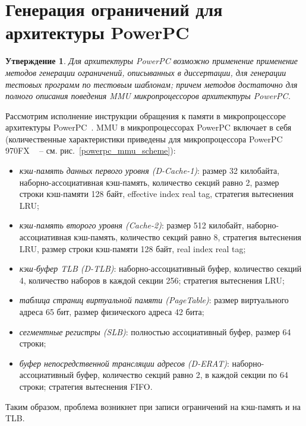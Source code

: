 \documentclass[14pt]{extreport}
\newtheorem{utv}{Утверждение}
\newcommand{\LRU}{\textsf{LRU}\xspace}
\newcommand{\FIFO}{\textsf{FIFO}\xspace}
\begin{document}


\section{Генерация ограничений для архитектуры PowerPC}

\begin{utv}
Для архитектуры PowerPC возможно применение применение методов
генерации ограничений, описыванных в диссертации, для генерации
тестовых программ по тестовым шаблонам; причем методов достаточно
для полного описания поведения MMU микропроцессоров архитектуры
PowerPC.
\end{utv}

Рассмотрим исполнение инструкции обращения к памяти в
микропроцессоре архитектуры PowerPC~\cite{shnitman}. MMU в
микропроцессорах PowerPC включает в себя (количественные
характеристики приведены для микропроцессора PowerPC 970FX
~\cite{PowerPC970FXUserManual} -- см.
рис.~\ref{powerpc_mmu_scheme}):
\begin{itemize}
  \item \emph{кэш-память данных первого уровня (D-Cache-1)}: размер 32
килобайта, наборно-ассоциативная кэш-память, количество секций равно
2, размер строки кэш-памяти 128 байт, effective index real tag,
стратегия вытеснения \LRU;
  \item \emph{кэш-память второго уровня (Cache-2)}: размер 512
  килобайт, наборно-ассоциативная кэш-память, количество секций
  равно 8, стратегия вытеснения LRU, размер строки кэш-памяти 128
  байт, real index real tag;
  \item \emph{кэш-буфер TLB (D-TLB)}: наборно-ассоциативный буфер,
  количество секций 4, количество наборов в каждой секции 256;
  стратегия вытеснения LRU;
  \item \emph{таблица страниц виртуальной памяти (PageTable)}: размер
  виртуального адреса 65 бит, размер физического адреса 42 бита;
  \item \emph{сегментные регистры (SLB)}: полностью ассоциативный
  буфер, размер 64 строки;
  \item \emph{буфер непосредственной трансляции адресов (D-ERAT)}:
  наборно-ассоциативный буфер, количество секций равно 2, в каждой
  секции по 64 строки; стратегия вытеснения \FIFO.
\end{itemize}
Таким образом, проблема возникнет при записи ограничений на
кэш-память и на TLB.
\end{document}
